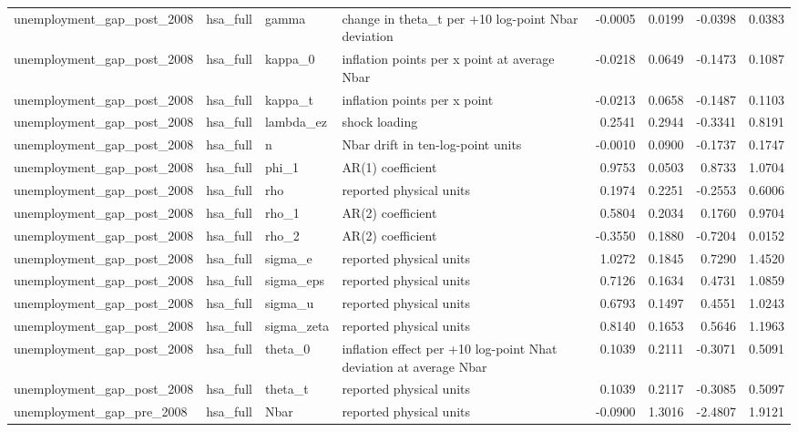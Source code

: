 \begin{tabular}{llllrrrr}
unemployment\_gap\_post\_2008 & hsa\_full & gamma & change in theta\_t per +10 log-point Nbar deviation & -0.0005 & 0.0199 & -0.0398 & 0.0383 \\
unemployment\_gap\_post\_2008 & hsa\_full & kappa\_0 & inflation points per x point at average Nbar & -0.0218 & 0.0649 & -0.1473 & 0.1087 \\
unemployment\_gap\_post\_2008 & hsa\_full & kappa\_t & inflation points per x point & -0.0213 & 0.0658 & -0.1487 & 0.1103 \\
unemployment\_gap\_post\_2008 & hsa\_full & lambda\_ez & shock loading & 0.2541 & 0.2944 & -0.3341 & 0.8191 \\
unemployment\_gap\_post\_2008 & hsa\_full & n & Nbar drift in ten-log-point units & -0.0010 & 0.0900 & -0.1737 & 0.1747 \\
unemployment\_gap\_post\_2008 & hsa\_full & phi\_1 & AR(1) coefficient & 0.9753 & 0.0503 & 0.8733 & 1.0704 \\
unemployment\_gap\_post\_2008 & hsa\_full & rho & reported physical units & 0.1974 & 0.2251 & -0.2553 & 0.6006 \\
unemployment\_gap\_post\_2008 & hsa\_full & rho\_1 & AR(2) coefficient & 0.5804 & 0.2034 & 0.1760 & 0.9704 \\
unemployment\_gap\_post\_2008 & hsa\_full & rho\_2 & AR(2) coefficient & -0.3550 & 0.1880 & -0.7204 & 0.0152 \\
unemployment\_gap\_post\_2008 & hsa\_full & sigma\_e & reported physical units & 1.0272 & 0.1845 & 0.7290 & 1.4520 \\
unemployment\_gap\_post\_2008 & hsa\_full & sigma\_eps & reported physical units & 0.7126 & 0.1634 & 0.4731 & 1.0859 \\
unemployment\_gap\_post\_2008 & hsa\_full & sigma\_u & reported physical units & 0.6793 & 0.1497 & 0.4551 & 1.0243 \\
unemployment\_gap\_post\_2008 & hsa\_full & sigma\_zeta & reported physical units & 0.8140 & 0.1653 & 0.5646 & 1.1963 \\
unemployment\_gap\_post\_2008 & hsa\_full & theta\_0 & inflation effect per +10 log-point Nhat deviation at average Nbar & 0.1039 & 0.2111 & -0.3071 & 0.5091 \\
unemployment\_gap\_post\_2008 & hsa\_full & theta\_t & reported physical units & 0.1039 & 0.2117 & -0.3085 & 0.5097 \\
unemployment\_gap\_pre\_2008 & hsa\_full & Nbar & reported physical units & -0.0900 & 1.3016 & -2.4807 & 1.9121 \\

\end{tabular}
